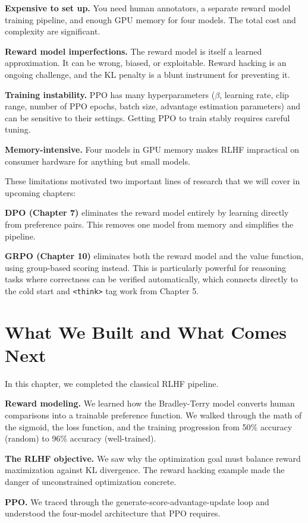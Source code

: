 \begin{chapterenv}
\textbf{Expensive to set up.} You need human annotators, a separate reward model training pipeline, and enough GPU memory for four models. The total cost and complexity are significant.

\textbf{Reward model imperfections.} The reward model is itself a learned approximation. It can be wrong, biased, or exploitable. Reward hacking is an ongoing challenge, and the KL penalty is a blunt instrument for preventing it.

\textbf{Training instability.} PPO has many hyperparameters ($\beta$, learning rate, clip range, number of PPO epochs, batch size, advantage estimation parameters) and can be sensitive to their settings. Getting PPO to train stably requires careful tuning.

\textbf{Memory-intensive.} Four models in GPU memory makes RLHF impractical on consumer hardware for anything but small models.

These limitations motivated two important lines of research that we will cover in upcoming chapters:

\textbf{DPO (Chapter 7)} eliminates the reward model entirely by learning directly from preference pairs. This removes one model from memory and simplifies the pipeline.

\textbf{GRPO (Chapter 10)} eliminates both the reward model and the value function, using group-based scoring instead. This is particularly powerful for reasoning tasks where correctness can be verified automatically, which connects directly to the cold start and \texttt{<think>} tag work from Chapter 5.

\section{What We Built and What Comes Next}

In this chapter, we completed the classical RLHF pipeline.

\textbf{Reward modeling.} We learned how the Bradley-Terry model converts human comparisons into a trainable preference function. We walked through the math of the sigmoid, the loss function, and the training progression from 50\% accuracy (random) to 96\% accuracy (well-trained).

\textbf{The RLHF objective.} We saw why the optimization goal must balance reward maximization against KL divergence. The reward hacking example made the danger of unconstrained optimization concrete.

\textbf{PPO.} We traced through the generate-score-advantage-update loop and understood the four-model architecture that PPO requires.


\end{chapterenv}
